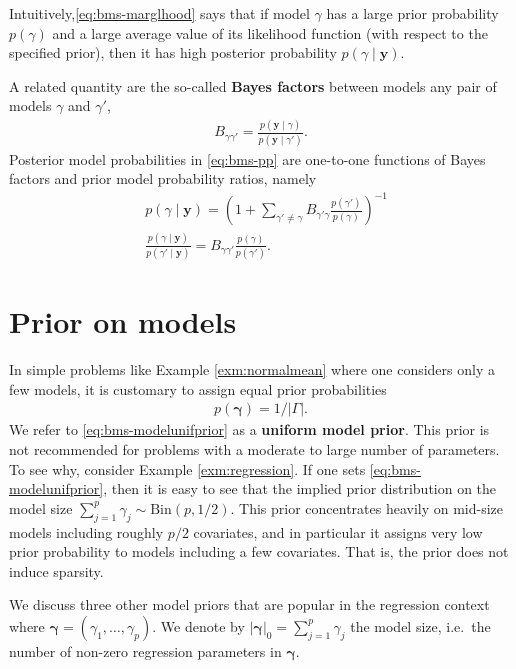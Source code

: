 \documentclass[
]{book}
\newcommand{\bgamma}{\mathbf{\gamma}}
\newcommand{\by}{\mathbf{y}}
\theoremstyle{definition}
\theoremstyle{definition}
\theoremstyle{definition}
\theoremstyle{definition}
\theoremstyle{remark}
\begin{document}
Intuitively,\eqref{eq:bms-marglhood} says that if model \(\gamma\) has a large prior probability \(p(\gamma)\) and a large average value of its likelihood function (with respect to the specified prior), then it has high posterior probability \(p(\gamma \mid \by)\).

A related quantity are the so-called \textbf{Bayes factors} between models any pair of models \(\gamma\) and \(\gamma'\),
\begin{align}
B_{\gamma \gamma'}= \frac{p(\by \mid \gamma)}{p(\by \mid \gamma')}.
\label{eq:bms-bf}
\end{align}
Posterior model probabilities in \eqref{eq:bms-pp} are one-to-one functions of Bayes factors and prior model probability ratios, namely
\begin{align*}
&p(\gamma \mid \by)= \left( 1 + \sum_{\gamma' \neq \gamma} B_{\gamma' \gamma} \frac{p(\gamma')}{p(\gamma)}   \right)^{-1}
\\
&\frac{p(\gamma \mid \by)}{p(\gamma' \mid \by)}= B_{\gamma \gamma'} \frac{p(\gamma)}{p(\gamma')}.
\end{align*}

\section{Prior on models}\label{bms-modelprior}

In simple problems like Example \ref{exm:normalmean} where one considers only a few models, it is customary to assign equal prior probabilities
\begin{align}
p(\bgamma)=  1 / |\Gamma|.
\label{eq:bms-modelunifprior}
\end{align}
We refer to \eqref{eq:bms-modelunifprior} as a \textbf{uniform model prior}.
This prior is not recommended for problems with a moderate to large number of parameters.
To see why, consider Example \ref{exm:regression}.
If one sets \eqref{eq:bms-modelunifprior}, then it is easy to see that the implied prior distribution on the model size \(\sum_{j=1}^p \gamma_j \sim \mbox{Bin}(p,1/2)\). This prior concentrates heavily on mid-size models including roughly \(p/2\) covariates, and in particular it assigns very low prior probability to models including a few covariates. That is, the prior does not induce sparsity.

We discuss three other model priors that are popular in the regression context where \(\bgamma= (\gamma_1,\ldots,\gamma_p)\).
We denote by \(|\bgamma|_0= \sum_{j=1}^p \gamma_j\) the model size, i.e.~the number of non-zero regression parameters in \(\bgamma\).
\end{document}
